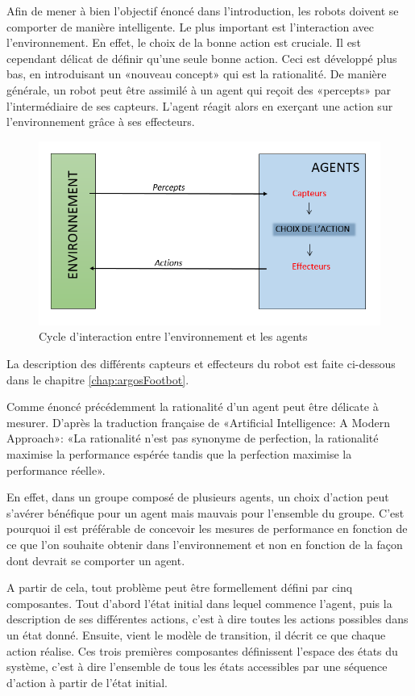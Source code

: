 \documentclass[a4paper]{report}
\begin{document}
Afin de mener à bien l'objectif énoncé dans l'introduction, les robots doivent se comporter de manière intelligente. Le plus important est l'interaction avec l'environnement. En effet, le choix de la bonne action est cruciale. Il est cependant délicat de définir qu'une seule bonne action. Ceci est développé plus bas, en introduisant un «nouveau concept» qui est la rationalité. 
De manière générale, un robot peut être assimilé à un agent qui reçoit des «percepts» par l'intermédiaire de ses capteurs. L'agent réagit alors en exerçant une action sur l'environnement grâce à ses effecteurs.
\begin{figure}[h!]
   \includegraphics[width=\textwidth]{cycleInteractionAI.png}
      \caption{Cycle d'interaction entre l'environnement et les agents}
\end{figure}
La description des différents capteurs et effecteurs du robot est faite ci-dessous dans le chapitre \ref{chap:argosFootbot}.

Comme énoncé précédemment la rationalité d'un agent peut être délicate à mesurer. D'après la traduction française de «Artificial Intelligence: A Modern Approach»: «La rationalité n'est pas synonyme de perfection, la rationalité maximise la performance espérée tandis que la perfection maximise la performance réelle».\cite{AIBrique}

En effet, dans un groupe composé de plusieurs agents, un choix d'action peut s'avérer bénéfique pour un agent mais mauvais pour l'ensemble du groupe. C'est pourquoi il est préférable de concevoir les mesures de performance en fonction de ce que l'on souhaite obtenir dans l'environnement et non en fonction de la façon dont devrait se comporter un agent.

A partir de cela, tout problème peut être formellement défini par cinq composantes. Tout d'abord l'état initial dans lequel commence l'agent, puis la description de ses différentes actions, c'est à dire toutes les actions possibles dans un état donné. Ensuite, vient le modèle de transition, il décrit ce que chaque action réalise. Ces trois premières composantes définissent l'espace des états du système, c'est à dire l'ensemble de tous les états accessibles par une séquence d'action à partir de l'état initial.
\end{document}
